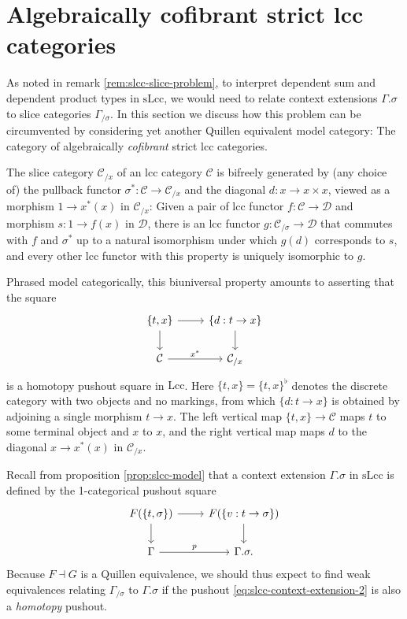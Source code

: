 \documentclass[a4paper]{article}
\theoremstyle{remark}
\theoremstyle{definition}
\begin{document}
\section{Algebraically cofibrant strict lcc categories}
\label{sec:algebraically-cofibrant}

As noted in remark \ref{rem:slcc-slice-problem}, to interpret dependent sum and dependent product types in $\mathrm{sLcc}$, we would need to relate context extensions $\Gamma.\sigma$ to slice categories $\Gamma_{/ \sigma}$.
In this section we discuss how this problem can be circumvented by considering yet another Quillen equivalent model category: The category of algebraically \emph{cofibrant} strict lcc categories.

The slice category $\mathcal{C}_{/ x}$ of an lcc category $\mathcal{C}$ is bifreely generated by (any choice of) the pullback functor $\sigma^* : \mathcal{C} \rightarrow \mathcal{C}_{/ x}$ and the diagonal $d : x \rightarrow x \times x$, viewed as a morphism $1 \rightarrow x^*(x)$ in $\mathcal{C}_{/ x}$:
Given a pair of lcc functor $f : \mathcal{C} \rightarrow \mathcal{D}$ and morphism $s : 1 \rightarrow f(x)$ in $\mathcal{D}$, there is an lcc functor $g : \mathcal{C}_{/ \sigma} \rightarrow \mathcal{D}$ that commutes with $f$ and $\sigma^*$ up to a natural isomorphism under which $g(d)$ corresponds to $s$, and every other lcc functor with this property is uniquely isomorphic to $g$.

Phrased model categorically, this biuniversal property amounts to asserting that the square
\begin{equation}
  \label{eq:homotopy-pushout-lcc}
  \begin{tikzcd}
    \{ t, x \} \arrow[r] \arrow[d] & \{ d : t \rightarrow x \} \arrow[d] \\
    \mathcal{C} \arrow[r, "x^*"] & \mathcal{C}_{/ x}
  \end{tikzcd}
\end{equation}
is a homotopy pushout square in $\mathrm{Lcc}$.
Here $\{t, x\} = \{t, x\}^\flat$ denotes the discrete category with two objects and no markings, from which $\{d : t \rightarrow x\}$ is obtained by adjoining a single morphism $t \rightarrow x$.
The left vertical map $\{ t, x \} \rightarrow \mathcal{C}$ maps $t$ to some terminal object and $x$ to $x$, and the right vertical map maps $d$ to the diagonal $x \rightarrow x^*(x)$ in $\mathcal{C}_{/ x}$.

Recall from proposition \ref{prop:slcc-model} that a context extension $\Gamma.\sigma$ in $\mathrm{sLcc}$ is defined by the 1-categorical pushout square
\begin{equation}
  \label{eq:slcc-context-extension-2}
  \begin{tikzcd}
    F(\{ t, \sigma \}) \arrow[d] \arrow[r] & F(\{ v : t \rightarrow \sigma \}) \arrow[d] \\
    \Gamma \arrow[r, "p"] & \Gamma.\sigma.
  \end{tikzcd}
\end{equation}
Because $F \dashv G$ is a Quillen equivalence, we should thus expect to find weak equivalences relating $\Gamma_{/ \sigma}$ to $\Gamma.\sigma$ if the pushout \eqref{eq:slcc-context-extension-2} is also a \emph{homotopy} pushout.
\end{document}
